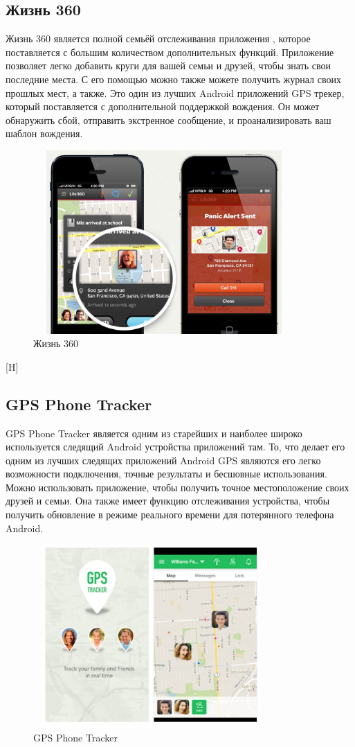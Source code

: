 \documentclass[a4paper,12pt]{article}
\begin{document}
\subsection{Жизнь 360}
Жизнь 360 является полной семьёй отслеживания приложения , которое поставляется с большим количеством дополнительных функций. Приложение позволяет легко добавить круги для вашей семьи и друзей, чтобы знать свои последние места. С его помощью можно также можете получить журнал своих прошлых мест, а также. Это один из лучших Android приложений GPS трекер, который поставляется с дополнительной поддержкой вождения. Он может обнаружить сбой, отправить экстренное сообщение, и проанализировать ваш шаблон вождения\cite{review5}.
\begin{figure}[H]
	\centering
	\includegraphics[width=10cm,height=7cm]{images/15023617296655.jpg}
	\caption{Жизнь 360}
	\label{fig:card}
\end{figure}[H]
\subsection{GPS Phone Tracker}
GPS Phone Tracker является одним из старейших и наиболее широко используется следящий Android устройства приложений там. То, что делает его одним из лучших следящих приложений Android GPS являются его легко возможности подключения, точные результаты и бесшовные использования. Можно использовать приложение, чтобы получить точное местоположение своих друзей и семьи. Она также имеет функцию отслеживания устройства, чтобы получить обновление в режиме реального времени для потерянного телефона Android\cite{review5}.
\begin{figure}[H]
	\centering
	\includegraphics[width=9cm,height=7cm]{images/15023616915620.jpg}
	\caption{GPS Phone Tracker}
	\label{fig:card}
\end{figure}
\end{document}
